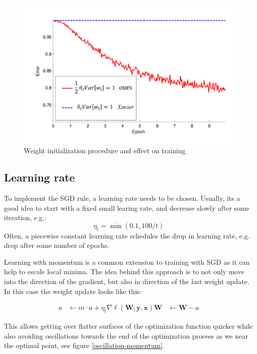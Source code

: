 \documentclass[a4paper,10pt,twoside]{article}
\newlength{\drop}
\begin{document}
\begin{figure}
    \centering
    \includegraphics[]{figures/weight-init-he-xavier.png}
    \caption{Weight initialization procedure and effect on training}
    \label{weight-init-he-xavier}
\end{figure}

\subsection{Learning rate}

To implement the SGD rule, a learning rate needs to be chosen. Usually, its a good idea to start with a fixed small learing rate, and decrease slowly after some iteration, e.g.:
\begin{equation*}
    \eta_t=\min (0.1, 100/t)
\end{equation*}
Often, a piecewise constant learning rate schedules the drop in learning rate, e.g. drop after some number of epochs.

Learning with momentum is a common extension to training with SGD as it can help to escale local minima. The idea behind this approach is to not only move into the direction of the gradient, but also in direction of the last weight update. In this case the weight update looks like this:

\begin{align*}
    a&\leftarrow m\cdot a+\eta_t\nabla\ell(\mathbf{W};\mathbf{y},\mathbf{x})
    \mathbf{W}&\leftarrow\mathbf{W}-a
\end{align*}

This allows getting over flatter surfaces of the optimization function quicker while also avoiding oscillations towards the end of the optimization process as we near the optimal point, see figure \ref{oscillation-momentum}.
\end{document}
